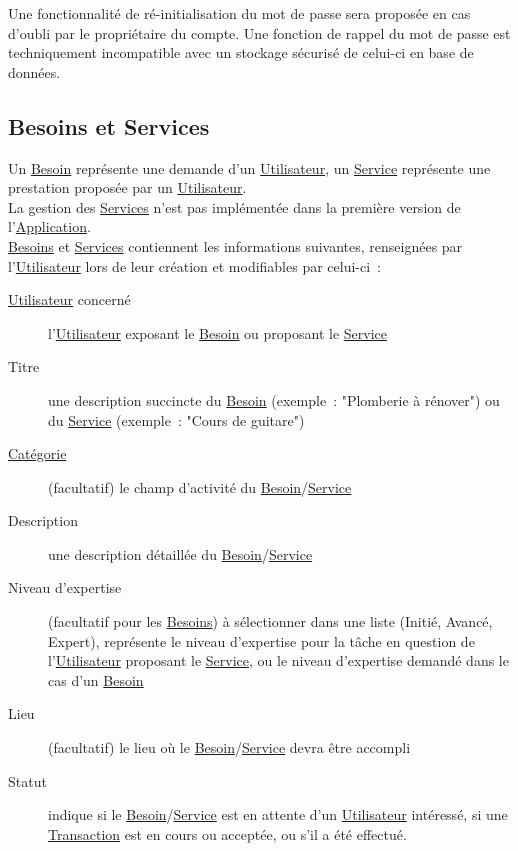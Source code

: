 \documentclass[french,12pt]{article}
\begin{document}
			Une fonctionnalité de ré-initialisation du mot de passe sera proposée en
			 cas d’oubli par le propriétaire du compte. Une fonction de rappel du mot
			 de passe est techniquement incompatible avec un stockage sécurisé de
			 celui-ci en base de données.
			
		\newpage
		\subsection{Besoins et Services}
			Un \hyperlink{besoin}{Besoin} représente une demande d’un
			 \hyperlink{utilisateur}{Utilisateur}, un \hyperlink{service}{Service}
			 représente une prestation proposée par un
			 \hyperlink{utilisateur}{Utilisateur}.\\
			
			La gestion des \hyperlink{service}{Services} n’est pas implémentée dans la
			 première version de l’\hyperlink{application}{Application}.\\
			
			\hyperlink{besoin}{Besoins} et \hyperlink{service}{Services} contiennent
			 les informations suivantes, renseignées par
			 l’\hyperlink{utilisateur}{Utilisateur} lors de leur création et
			 modifiables par celui-ci :
			\begin{description}
				\item [\hyperlink{utilisateur}{Utilisateur} concerné]
					l’\hyperlink{utilisateur}{Utilisateur} exposant le
					 \hyperlink{besoin}{Besoin} ou proposant le
					 \hyperlink{service}{Service}
				\item [Titre]
					une description succincte du \hyperlink{besoin}{Besoin} (exemple :
					 "Plomberie à rénover") ou du \hyperlink{service}{Service} (exemple :
					 "Cours de guitare")
				\item [\hyperlink{categorie}{Catégorie}]
					(facultatif) le champ d’activité du
					 \hyperlink{besoin}{Besoin}/\hyperlink{service}{Service}
				\item [Description]
					une description détaillée du
					 \hyperlink{besoin}{Besoin}/\hyperlink{service}{Service}
				\item [Niveau d’expertise]
					(facultatif pour les \hyperlink{besoin}{Besoins}) à sélectionner dans
					 une liste (Initié, Avancé, Expert), représente le niveau d’expertise
					 pour la tâche en question de l’\hyperlink{utilisateur}{Utilisateur}
					 proposant le \hyperlink{service}{Service}, ou le niveau d’expertise
					 demandé dans le cas d’un \hyperlink{besoin}{Besoin}
				\item [Lieu]
					(facultatif) le lieu où le
					 \hyperlink{besoin}{Besoin}/\hyperlink{service}{Service} devra être
					 accompli
				\item [Statut]
					indique si le \hyperlink{besoin}{Besoin}/\hyperlink{service}{Service}
					 est en attente d’un \hyperlink{utilisateur}{Utilisateur} intéressé,
					 si une \hyperlink{transaction}{Transaction} est en cours ou acceptée,
					 ou s’il a été effectué.
			\end{description}
			
\end{document}
